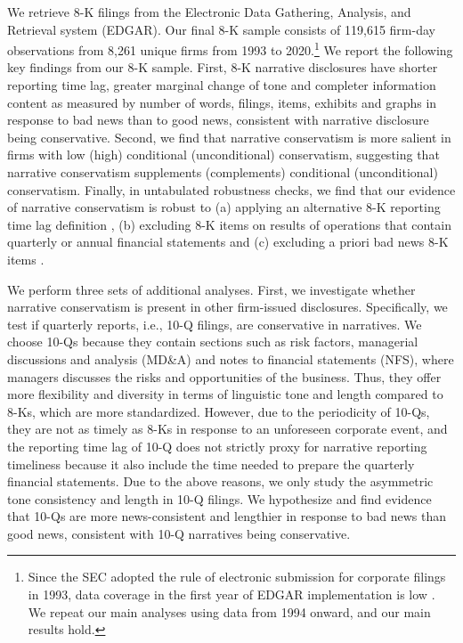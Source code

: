 \documentclass[letterpaper,12pt]{article}
\begin{document}
\begin{spacing}{1.5}
We retrieve 8-K filings from the Electronic Data Gathering, Analysis, and Retrieval system (EDGAR). Our final 8-K sample consists of 119,615 firm-day observations from 8,261 unique firms from 1993 to 2020.\footnote{Since the SEC adopted the rule of electronic submission for corporate filings in 1993, data coverage in the first year of EDGAR implementation is low \cite{gaoInformingMarketEffect2020}. We repeat our main analyses using data from 1994 onward, and our main results hold.} We report the following key findings from our 8-K sample. First, 8-K narrative disclosures have shorter reporting time lag, greater marginal change of tone and completer information content as measured by number of words, filings, items, exhibits and graphs in response to bad news than to good news, consistent with narrative disclosure being conservative. Second, we find that narrative conservatism is more salient in firms with low (high) conditional (unconditional) conservatism, suggesting that narrative conservatism supplements (complements) conditional (unconditional) conservatism. Finally, in untabulated robustness checks, we find that our evidence of narrative conservatism is robust to (a) applying an alternative 8-K reporting time lag definition \cite{carterRelevanceForm8K1999, niessnerStrategicDisclosureTiming2015, chapmanInformationOverloadDisclosure2019}, (b) excluding 8-K items on results of operations that contain quarterly or annual financial statements \cite{segalAreManagersStrategic2016} and (c) excluding a priori bad news 8-K items \cite{segalAreManagersStrategic2016}.

We perform three sets of additional analyses. First, we investigate whether narrative conservatism is present in other firm-issued disclosures. Specifically, we test if quarterly reports, i.e., 10-Q filings, are conservative in narratives. We choose 10-Qs because they contain sections such as risk factors, managerial discussions and analysis (MD\&A) and notes to financial statements (NFS), where managers discusses the risks and opportunities of the business. Thus, they offer more flexibility and diversity in terms of linguistic tone and length compared to 8-Ks, which are more standardized. However, due to the periodicity of 10-Qs, they are not as timely as 8-Ks in response to an unforeseen corporate event, and the reporting time lag of 10-Q does not strictly proxy for narrative reporting timeliness because it also include the time needed to prepare the quarterly financial statements. Due to the above reasons, we only study the asymmetric tone consistency and length in 10-Q filings. We hypothesize and find evidence that 10-Qs are more news-consistent and lengthier in response to bad news than good news, consistent with 10-Q narratives being conservative.  


\end{spacing}
\end{document}
